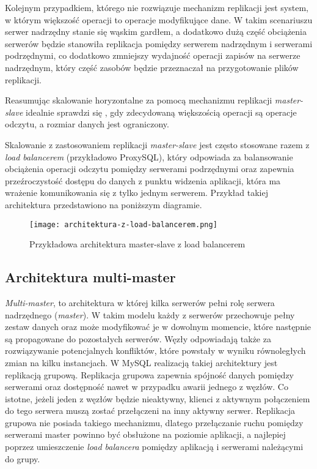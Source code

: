 Kolejnym przypadkiem, którego nie rozwiązuje mechanizm replikacji jest system, w którym większość operacji to operacje modyfikujące dane. W takim scenariuszu serwer nadrzędny stanie się wąskim gardłem, a dodatkowo dużą część obciążenia serwerów będzie stanowiła replikacja pomiędzy serwerem nadrzędnym i serwerami podrzędnymi, co dodatkowo zmniejszy wydajność operacji zapisów na serwerze nadrzędnym, który część zasobów będzie przeznaczał na przygotowanie plików replikacji.

Reasumując skalowanie horyzontalne za pomocą mechanizmu replikacji \textit{master-slave} idealnie sprawdzi się , gdy zdecydowaną większością operacji są operacje odczytu, a rozmiar danych jest ograniczony.

Skalowanie z zastosowaniem replikacji \textit{master-slave} jest często stosowane razem z \textit{load balancerem} (przykładowo ProxySQL), który odpowiada za balansowanie obciążenia operacji odczytu pomiędzy serwerami podrzędnymi oraz zapewnia przeźroczystość dostępu do danych z punktu widzenia aplikacji, która ma wrażenie komunikowania się z tylko jednym serwerem. Przykład takiej architektura przedstawiono na poniższym diagramie.

\begin{figure}[!h]
	\centering
	\texttt{[image: architektura-z-load-balancerem.png]}
	\caption{Przykładowa architektura master-slave z load balancerem}
	\label{fig:label}
\end{figure}

\subsection{Architektura multi-master}
\textit{Multi-master}, to architektura w której kilka serwerów pełni rolę serwera nadrzędnego (\textit{master}). W takim modelu każdy z serwerów przechowuje pełny zestaw danych oraz może modyfikować je w dowolnym momencie, które następnie są propagowane do pozostałych serwerów. Węzły odpowiadają także za rozwiązywanie potencjalnych konfliktów, które powstały w wyniku równoległych zmian na kilku instancjach. W MySQL realizacją takiej architektury jest replikacją grupową. Replikacja grupowa zapewnia spójność danych pomiędzy serwerami oraz dostępność nawet w przypadku awarii jednego z węzłów. Co istotne, jeżeli jeden z węzłów będzie nieaktywny, klienci z aktywnym połączeniem do tego serwera muszą zostać przełączeni na inny aktywny serwer. Replikacja grupowa nie posiada takiego mechanizmu, dlatego przełączanie ruchu pomiędzy serwerami master powinno być obsłużone na poziomie aplikacji, a najlepiej poprzez umieszczenie \textit{load balancera} pomiędzy aplikacją i serwerami należącymi do grupy.

